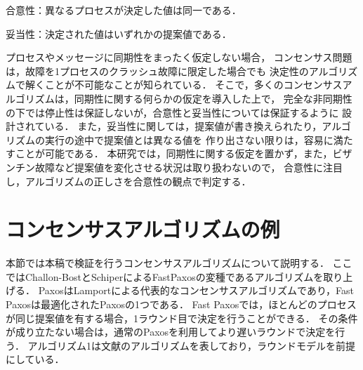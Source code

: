 \documentclass[technicalreport]{ieicej}
\theoremstyle{plain}
\begin{document}
合意性：異なるプロセスが決定した値は同一である．

妥当性：決定された値はいずれかの提案値である．

プロセスやメッセージに同期性をまったく仮定しない場合，
コンセンサス問題は，故障を1プロセスのクラッシュ故障に限定した場合でも
決定性のアルゴリズムで解くことが不可能なことが知られている．
そこで，多くのコンセンサスアルゴリズムは，同期性に関する何らかの仮定を導入した上で，
完全な非同期性の下では停止性は保証しないが，合意性と妥当性については保証するように
設計されている．
また，妥当性に関しては，提案値が書き換えられたり，アルゴリズムの実行の途中で提案値とは異なる値を
作り出さない限りは，容易に満たすことが可能である．
本研究では，同期性に関する仮定を置かず，また，ビザンチン故障など提案値を変化させる状況は取り扱わないので，
合意性に注目し，アルゴリズムの正しさを合意性の観点で判定する．


\section{コンセンサスアルゴリズムの例}

本節では本稿で検証を行うコンセンサスアルゴリズムについて説明する．
ここではChallon-BostとSchiperによるFastPaxosの変種であるアルゴリズムを取り上げる．
PaxosはLamportによる代表的なコンセンサスアルゴリズムであり，Fast Paxosは最適化されたPaxosの1つである．
Fast Paxosでは，ほとんどのプロセスが同じ提案値を有する場合，1ラウンド目で決定を行うことができる．
その条件が成り立たない場合は，通常のPaxosを利用してより遅いラウンドで決定を行う．
アルゴリズム1は文献のアルゴリズムを表しており，ラウンドモデルを前提にしている．


\end{document}
